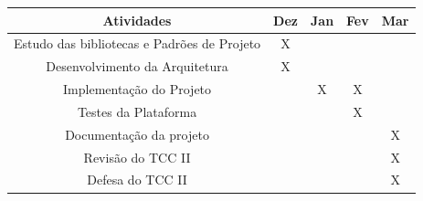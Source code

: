     \begin{quadro}[h]
        \caption{Cronograma de Atividades TCC II - Dez/2022 a Mar/2023}
        \centering
        \begin{tabular}{c c c c c} \hline
            \label{quad:cronograma-atividades}
            \textbf{Atividades}                         & \textbf{Dez} & \textbf{Jan} & \textbf{Fev} & \textbf{Mar} \\ \hline
            Estudo das bibliotecas e Padrões de Projeto & X            &              &              &              \\ \hline
            Desenvolvimento da Arquitetura              & X            &              &              &              \\ \hline
            Implementação do Projeto                    &              & X            & X            &              \\ \hline
            Testes da Plataforma                        &              &              & X            &              \\ \hline
            Documentação da projeto                     &              &              &              & X            \\ \hline
            Revisão do TCC II                           &              &              &              & X            \\ \hline
            Defesa do TCC II                            &              &              &              & X            \\ \hline
        \end{tabular}
    \end{quadro}
